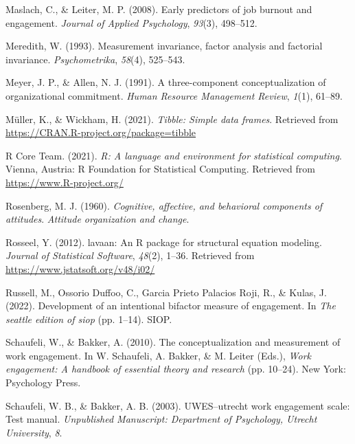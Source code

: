 \documentclass[
  english,
  man]{apa6}
\begin{document}
\leavevmode\hypertarget{ref-maslach_early_2008}{}%
Maslach, C., \& Leiter, M. P. (2008). Early predictors of job burnout and engagement. \emph{Journal of Applied Psychology}, \emph{93}(3), 498--512.

\leavevmode\hypertarget{ref-meredith1993measurement}{}%
Meredith, W. (1993). Measurement invariance, factor analysis and factorial invariance. \emph{Psychometrika}, \emph{58}(4), 525--543.

\leavevmode\hypertarget{ref-meyer_three-component_1991}{}%
Meyer, J. P., \& Allen, N. J. (1991). A three-component conceptualization of organizational commitment. \emph{Human Resource Management Review}, \emph{1}(1), 61--89.

\leavevmode\hypertarget{ref-R-tibble}{}%
Müller, K., \& Wickham, H. (2021). \emph{Tibble: Simple data frames}. Retrieved from \url{https://CRAN.R-project.org/package=tibble}

\leavevmode\hypertarget{ref-R-base}{}%
R Core Team. (2021). \emph{R: A language and environment for statistical computing}. Vienna, Austria: R Foundation for Statistical Computing. Retrieved from \url{https://www.R-project.org/}

\leavevmode\hypertarget{ref-rosenberg_cognitive_1960}{}%
Rosenberg, M. J. (1960). \emph{Cognitive, affective, and behavioral components of attitudes}. \emph{Attitude organization and change}.

\leavevmode\hypertarget{ref-R-lavaan}{}%
Rosseel, Y. (2012). lavaan: An R package for structural equation modeling. \emph{Journal of Statistical Software}, \emph{48}(2), 1--36. Retrieved from \url{https://www.jstatsoft.org/v48/i02/}

\leavevmode\hypertarget{ref-engage_2022}{}%
Russell, M., Ossorio Duffoo, C., Garcia Prieto Palacios Roji, R., \& Kulas, J. (2022). Development of an intentional bifactor measure of engagement. In \emph{The seattle edition of siop} (pp. 1--14). SIOP.

\leavevmode\hypertarget{ref-schaufeli_conceptualization_2010}{}%
Schaufeli, W., \& Bakker, A. (2010). The conceptualization and measurement of work engagement. In W. Schaufeli, A. Bakker, \& M. Leiter (Eds.), \emph{Work engagement: A handbook of essential theory and research} (pp. 10--24). New York: Psychology Press.

\leavevmode\hypertarget{ref-schaufeli_uwesutrecht_2003}{}%
Schaufeli, W. B., \& Bakker, A. B. (2003). UWES--utrecht work engagement scale: Test manual. \emph{Unpublished Manuscript: Department of Psychology, Utrecht University}, \emph{8}.
\end{document}
